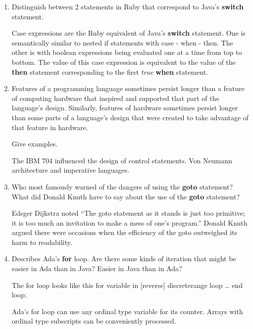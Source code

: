 \begin{enumerate}
  \item Distinguish between 2 statements in Ruby
    that correspond to Java's \textbf{switch} statement.

  \begin{answer}
  Case expressions are the Ruby equivalent of Java's \textbf{switch} statement. One is semantically similar to nested if statements with case - when - then. The other is with boolean expressions being evaluated one at a time from top to bottom. The value of this case expression is equivalent to the value of the \textbf{then} statement corresponding to the first \textit{true} \textbf{when} statement.
  \end{answer}


  \item Features of a programming language sometimes persist
    longer than a feature of computing hardware that inspired
    and supported that part of the language's design.
    Similarly, features of hardware sometimes persist longer
    than some parts of a language's design that were created
    to take advantage of that feature in hardware.

    Give examples.

  \begin{answer}
  The IBM 704 influenced the design of control statements.
  Von Neumann architecture and imperative languages. 
  \end{answer}

  \item Who most famously warned of the dangers of using the
    \textbf{goto} statement? What did Donald Knuth have to
    say about the use of the \textbf{goto} statement?

  \begin{answer}
   Edsger Dijkstra noted “The goto statement as it stands is just too primitive; it is too much an invitation to make a mess of one’s program.” Donald Knuth argued there were occasions when the efficiency of the goto outweighed its harm to readability.
  \end{answer}

  \item Describes Ada's \textbf{for} loop. Are there some
    kinds of iteration that might be easier in Ada than
    in Java? Easier in Java than in Ada?

  \begin{answer}
  The for loop looks like this
 for variable in [reverse] discreterange loop … end loop; 

  Ada’s for loop can use any ordinal type variable for its counter. Arrays with ordinal type subscripts can be conveniently processed.
  \end{answer}


\end{enumerate}
